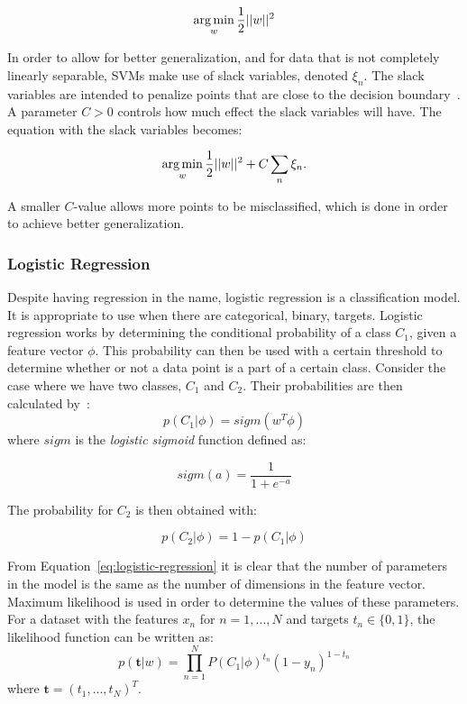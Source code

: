\begin{equation}
    \operatorname*{arg\,min}_{w}\frac{1}{2}||w||^2
\end{equation}

In order to allow for better generalization, and for data that is not completely linearly separable, SVMs make use of slack variables, denoted $\xi_n$.
The slack variables are intended to penalize points that are close to the decision boundary~\cite{bishop2006pattern}.
A parameter $C>0$ controls how much effect the slack variables will have.
The equation with the slack variables becomes:

\begin{equation}
    \operatorname*{arg\,min}_{w}\frac{1}{2}||w||^2 + C \sum_n\xi_n.
\end{equation}

A smaller $C$-value allows more points to be misclassified, which is done in order to achieve better generalization.

\subsubsection{Logistic Regression}

Despite having regression in the name, logistic regression is a classification model.
It is appropriate to use when there are categorical, binary, targets.
Logistic regression works by determining the conditional probability of a class $C_1$, given a feature vector $\phi$.
This probability can then be used with a certain threshold to determine whether or not a data point is a part of a certain class.
Consider the case where we have two classes, $C_1$ and $C_2$.
Their probabilities are then calculated by~\cite{bishop2006pattern}:
\begin{equation}\label{eq:logistic-regression}
    p(C_1|\phi) = sigm(w^T\phi)
\end{equation}
where $sigm$ is the \textit{logistic sigmoid} function defined as:

\begin{equation}
    sigm(a) = \frac{1}{1+e^{-a}}
\end{equation}

The probability for $C_2$ is then obtained with:

\begin{equation}
    p(C_2|\phi) = 1 - p(C_1|\phi)
\end{equation}

From Equation~\ref{eq:logistic-regression} it is clear that the number of parameters in the model is the same as the number of dimensions in the feature vector.
Maximum likelihood is used in order to determine the values of these parameters.
For a dataset with the features $x_n$ for $n=1,...,N$ and targets $t_n \in \{0,1\}$, the likelihood function can be written as:
\begin{equation}
    p(\boldsymbol{t}|w) = \prod_{n=1}^N P(C_1|\phi)^{t_n}(1-y_n)^{1-t_n}
\end{equation}
where $\boldsymbol{t} = (t_1, ..., t_N)^T$.

